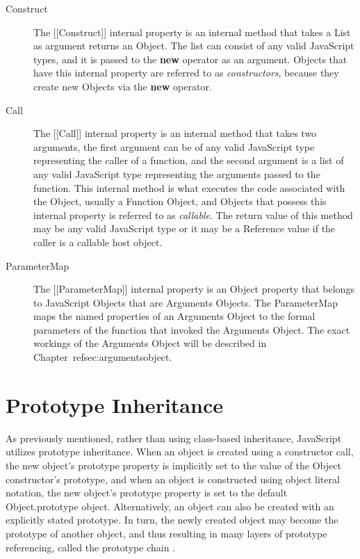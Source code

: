 \documentclass[a4paper,11pt,twoside]{report}
\begin{document}
\begin{description}
\item[Construct]
The [[Construct]] internal property is an internal method that takes a List as argument returns an Object. The list can consist of any valid JavaScript types, and it is passed to the \textbf{new} operator as an argument. Objects that have this internal property are referred to as \textit{constructors}, because they create new Objects via the \textbf{new} operator.

\item[Call]
The [[Call]] internal property is an internal method that takes two arguments, the first argument can be of any valid JavaScript type representing the caller of a function, and the second argument is a list of any valid JavaScript type representing the arguments passed to the function. This internal method is what executes the code associated with the Object, usually a Function Object, and Objects that possess this internal property is referred to as \textit{callable}. The return value of this method may be any valid JavaScript type or it may be a Reference value if the caller is a callable host object.

\item[ParameterMap]
The [[ParameterMap]] internal property is an Object property that belongs to JavaScript Objects that are Arguments Objects. The ParameterMap maps the named properties of an Arguments Object to the formal parameters of the function that invoked the Arguments Object. The exact workings of the Arguments Object will be described in Chapter~ref{sec:argumentsobject}.
\end{description}

\section{Prototype Inheritance}
As previously mentioned, rather than using class-based inheritance, JavaScript utilizes prototype inheritance. When an object is created using a constructor call, the new object's prototype property is implicitly set to the value of the Object constructor's prototype, and when an object is constructed using object literal notation, the new object's prototype property is set to the default Object.prototype object. Alternatively, an object can also be created with an explicitly stated prototype. In turn, the newly created object may become the prototype of another object, and thus resulting in many layers of prototype referencing, called the prototype chain \cite{EcmaScript}. 
\end{document}
